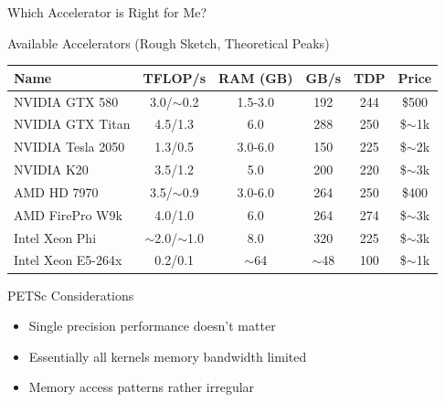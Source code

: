 \begin{frame}{Which Accelerator is Right for Me?}
 
  \begin{block}{Available Accelerators (Rough Sketch, Theoretical Peaks)}

   \begin{center}
    \begin{tabular}{|l|c|c|c|c|c|}
     \hline
      Name             & TFLOP/s & RAM (GB) & GB/s & TDP & Price \\
     \hline
     NVIDIA GTX 580    & 3.0/$\sim$0.2 & 1.5-3.0 & 192 & 244 & \$500   \\
     NVIDIA GTX Titan  & 4.5/1.3  & 6.0     & 288 & 250 & \$$\sim$1k \\
     NVIDIA Tesla 2050 & 1.3/0.5  & 3.0-6.0 & 150 & 225 & \$$\sim$2k \\
     NVIDIA K20        & 3.5/1.2  & 5.0     & 200 & 220 & \$$\sim$3k \\
     \hline
     AMD HD 7970       & 3.5/$\sim$0.9 & 3.0-6.0 & 264 & 250 & \$400 \\
     AMD FirePro W9k   & 4.0/1.0  & 6.0     & 264 & 274 & \$$\sim$3k \\
     \hline
     Intel Xeon Phi    & $\sim$2.0/$\sim$1.0 & 8.0 & 320 & 225 & \$$\sim$3k \\
     \hline
     \hline
     Intel Xeon E5-264x  & 0.2/0.1  & $\sim$64 & $\sim$48 & 100 & \$$\sim$1k \\
     \hline
   \end{tabular}
   \end{center}
  \end{block}

  \begin{block}{PETSc Considerations}
   \begin{itemize}
    \item Single precision performance doesn't matter
    \item Essentially all kernels memory bandwidth limited
    \item Memory access patterns rather irregular
   \end{itemize}
  \end{block}

\end{frame}


